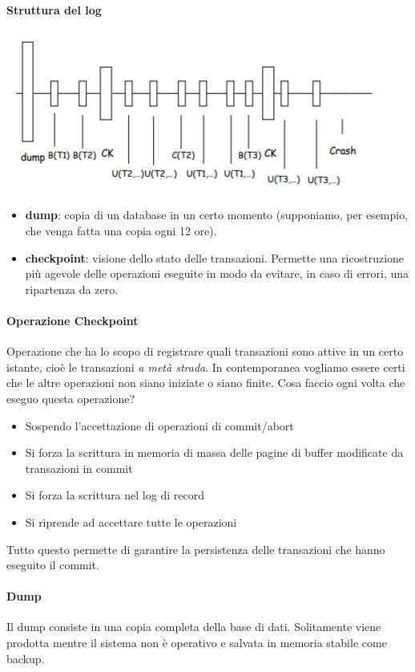 \paragraph{Struttura del log}
\begin{center}
	\includegraphics{images/135.PNG}
\end{center}
\begin{itemize}
	\item \textbf{dump}: copia di un database in un certo momento (supponiamo, per esempio, che venga fatta una copia ogni 12 ore).
	\item \textbf{checkpoint}: visione dello stato delle transazioni. Permette una ricostruzione più agevole delle operazioni eseguite in modo da evitare, in caso di errori, una ripartenza da zero.
\end{itemize}
\paragraph{Operazione Checkpoint} Operazione che ha lo scopo di registrare quali transazioni sono attive in un certo istante, cioè le transazioni \emph{a metà strada}. In contemporanea vogliamo essere certi che le altre operazioni non siano iniziate o siano finite. Cosa faccio ogni volta che eseguo questa operazione?
\begin{itemize}
	\item Sospendo l'accettazione di operazioni di commit/abort
	\item Si forza la scrittura in memoria di massa delle pagine di buffer modificate da transazioni in commit
	\item Si forza la scrittura nel log di record
	\item Si riprende ad accettare tutte le operazioni
\end{itemize}
Tutto questo permette di garantire la persistenza delle transazioni che hanno eseguito il commit.
\paragraph{Dump} Il dump consiste in una copia completa della base di dati. Solitamente viene prodotta mentre il sistema non è operativo e salvata in memoria stabile come backup.
